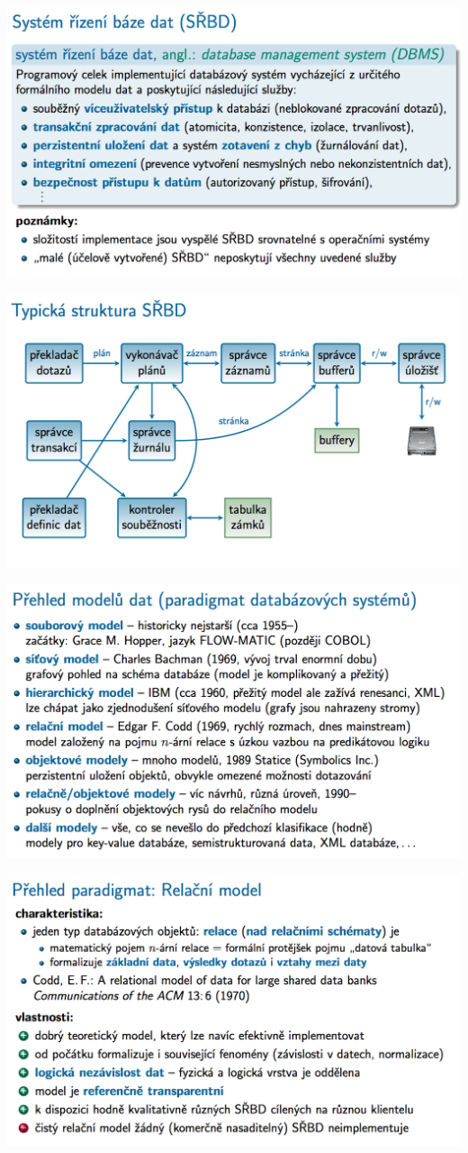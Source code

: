 \documentclass[10pt,a4paper]{article}
\begin{document}
\includegraphics[scale=0.4]{img/72}

\includegraphics[scale=0.4]{img/73}

\includegraphics[scale=0.4]{img/74}

\includegraphics[scale=0.4]{img/75}
\end{document}
